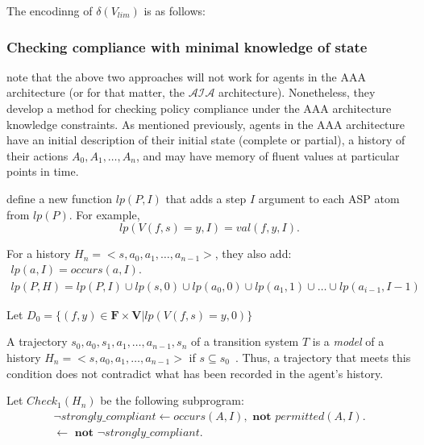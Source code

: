 The encodinng of $\delta(V_{lim})$ is as follows:


%



\subsubsection{Checking compliance with minimal knowledge of state}

\citet{gelfond_authorization_2008} note that the above two approaches will not work for agents in the AAA architecture (or for that matter, the $\mathcal{AIA}$ architecture).
Nonetheless, they develop a method for checking policy compliance under the AAA architecture knowledge constraints.
As mentioned previously, agents in the AAA architecture have an initial description of their initial state (complete or partial), a history of their actions $A_0, A_1, \dots, A_n$, and may have memory of fluent values at particular points in time.

\citet{gelfond_authorization_2008} define a new function $lp(P, I)$ that adds a step $I$ argument to each ASP atom from $lp(P)$.
For example,
\[
lp(V(f,s)=y, I) = val(f,y,I).
\]

For a history $H_n=<s, a_0, a_1, \dots, a_{n-1}>$, they also add:
\begin{gather*}
    lp(a, I)=occurs(a, I). \\
    lp(P, H) = lp(P, I) \cup lp(s, 0) \cup lp(a_0, 0) \cup lp(a_1, 1) \cup \dots \cup lp(a_{i-1}, I-1)
\end{gather*}

Let $D_0 = \{ (f,y) \in \boldsymbol{F} \times \boldsymbol{V} | lp(V(f,s)=y, 0)\}$

\begin{definition}
    \label{def:model_of_history}
    A trajectory $s_0, a_0, s_1, a_1, \dots, a_{n-1}, s_n$ of a transition system $T$ is a \textit{model} of a history $H_n = <s, a_0, a_1, \dots, a_{n-1}>$ if $s \subseteq s_0$~\citep{gelfond_authorization_2008}.
    Thus, a trajectory that meets this condition does not contradict what has been recorded in the agent's history.
\end{definition}

Let $Check_1(H_n)$ be the following subprogram:
\begin{gather*}
    \neg strongly\_compliant \leftarrow occurs(A, I), \textbf{ not } permitted(A, I). \\
    \leftarrow \textbf{ not } \neg strongly\_compliant.
\end{gather*}

